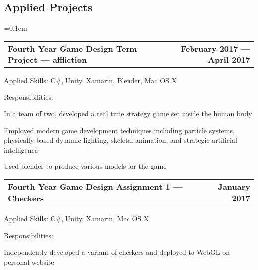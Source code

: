 \documentclass[10pt,letterpaper]{article}
\makeatletter
\newenvironment{indentsection}[1]%
{\begin{list}{}%
  {\setlength{\leftmargin}{#1}}%
  \item[]%
}
{\end{list}}
\newcommand{\headerrow}[2]
{\begin{tabular*}{\linewidth}{l@{\extracolsep{\fill}}r}
  #1 &
  #2 \\
\end{tabular*}}
\makeatother
\begin{document}
\subsection*{Applied Projects}

\begin{itemize}
  \parskip=0.1em

  \item
  \headerrow
    {\textbf{Fourth Year Game Design Term Project — affliction}}
    {\textbf{February 2017 — April 2017}}
  \begin{indentsection}{1em}
    \begin{description*}
      \item[Applied Skills:]
      C\#, Unity, Xamarin, Blender, Mac OS X
      \item[Responsibilities:]
      \hfill
      \begin{itemize*}
        \item In a team of two, developed a real time strategy game set inside the
        human body
        \item Employed modern game development techniques including particle
        systems, physically based dynamic lighting, skeletal animation, and
        strategic artificial intelligence
        \item Used blender to produce various models for the game
      \end{itemize*}
    \end{description*}
  \end{indentsection}

  \item
  \headerrow
    {\textbf{Fourth Year Game Design Assignment 1 — Checkers}}
    {\textbf{January 2017}}
  \begin{indentsection}{1em}
    \begin{description*}
      \item[Applied Skills:]
      C\#, Unity, Xamarin, Mac OS X
      \item[Responsibilities:]
      \hfill
      \begin{itemize*}
        \item Independently developed a variant of checkers and deployed to WebGL
        on personal website
      \end{itemize*}
    \end{description*}
  \end{indentsection}


\end{itemize}
\end{document}
